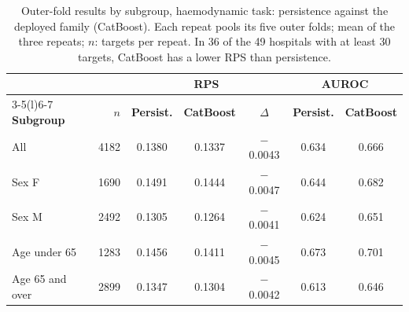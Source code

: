 \begin{table}[htbp]
\centering\footnotesize
\caption{Outer-fold results by subgroup, haemodynamic task: persistence against the deployed family (CatBoost). Each repeat pools its five outer folds; mean of the three repeats; $n$: targets per repeat. In 36 of the 49 hospitals with at least 30 targets, CatBoost has a lower RPS than persistence.}\label{tab:subgroups-haemodynamic}
\begin{tabular}{@{}lrccccc@{}}
\toprule
 & & \multicolumn{3}{c}{\textbf{RPS}} & \multicolumn{2}{c}{\textbf{AUROC}} \\
\cmidrule(lr){3-5}\cmidrule(l){6-7}
\textbf{Subgroup} & \textbf{$n$} & \textbf{Persist.} & \textbf{CatBoost} & \textbf{$\Delta$} & \textbf{Persist.} & \textbf{CatBoost} \\
\midrule
All & 4182 & 0.1380 & 0.1337 & $-$0.0043 & 0.634 & 0.666 \\
Sex F & 1690 & 0.1491 & 0.1444 & $-$0.0047 & 0.644 & 0.682 \\
Sex M & 2492 & 0.1305 & 0.1264 & $-$0.0041 & 0.624 & 0.651 \\
Age under 65 & 1283 & 0.1456 & 0.1411 & $-$0.0045 & 0.673 & 0.701 \\
Age 65 and over & 2899 & 0.1347 & 0.1304 & $-$0.0042 & 0.613 & 0.646 \\
\bottomrule
\end{tabular}
\end{table}
